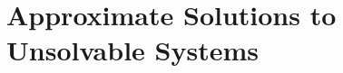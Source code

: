 \documentclass[00-livre-main.tex]{subfiles}
\begin{document}
\chapter{Approximate Solutions to Unsolvable Systems}
\end{document}
